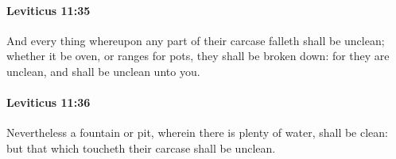 		\paragraph{Leviticus 11:35} %
			\label{LEVITICUS-11-35}

			And every thing whereupon any part of their carcase falleth shall be unclean; whether it be oven, or ranges for pots, they shall be broken down: for they are unclean, and shall be unclean unto you.


		\paragraph{Leviticus 11:36} %
			\label{LEVITICUS-11-36}

			Nevertheless a fountain or pit, wherein there is plenty of water, shall be clean: but that which toucheth their carcase shall be unclean.


